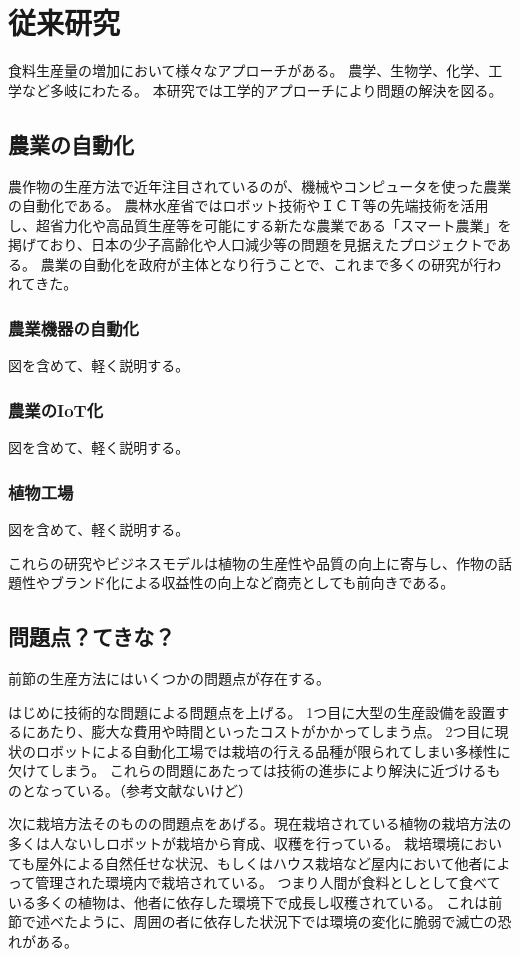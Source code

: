 \section{従来研究}
食料生産量の増加において様々なアプローチがある。
農学、生物学、化学、工学など多岐にわたる。
本研究では工学的アプローチにより問題の解決を図る。

\subsection{農業の自動化}
農作物の生産方法で近年注目されているのが、機械やコンピュータを使った農業の自動化である。
農林水産省ではロボット技術やＩＣＴ等の先端技術を活用し、超省力化や高品質生産等を可能にする新たな農業である「スマート農業」を掲げており、日本の少子高齢化や人口減少等の問題を見据えたプロジェクトである。
農業の自動化を政府が主体となり行うことで、これまで多くの研究が行われてきた。
\subsubsection{農業機器の自動化}
図を含めて、軽く説明する。
\subsubsection{農業のIoT化}
図を含めて、軽く説明する。
\subsubsection{植物工場}
図を含めて、軽く説明する。

これらの研究やビジネスモデルは植物の生産性や品質の向上に寄与し、作物の話題性やブランド化による収益性の向上など商売としても前向きである。
\subsection{問題点？てきな？}
前節の生産方法にはいくつかの問題点が存在する。
\par はじめに技術的な問題による問題点を上げる。
1つ目に大型の生産設備を設置するにあたり、膨大な費用や時間といったコストがかかってしまう点。
2つ目に現状のロボットによる自動化工場では栽培の行える品種が限られてしまい多様性に欠けてしまう。
これらの問題にあたっては技術の進歩により解決に近づけるものとなっている。（参考文献ないけど）
\par 次に栽培方法そのものの問題点をあげる。現在栽培されている植物の栽培方法の多くは人ないしロボットが栽培から育成、収穫を行っている。
栽培環境においても屋外による自然任せな状況、もしくはハウス栽培など屋内において他者によって管理された環境内で栽培されている。
つまり人間が食料としとして食べている多くの植物は、他者に依存した環境下で成長し収穫されている。
これは前節で述べたように、周囲の者に依存した状況下では環境の変化に脆弱で滅亡の恐れがある。
